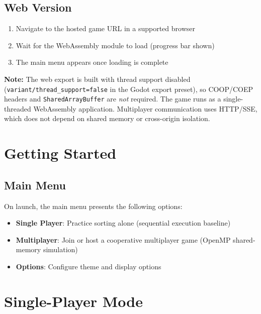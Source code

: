 \subsection{Web Version}

\begin{enumerate}
    \item Navigate to the hosted game URL in a supported browser
    \item Wait for the WebAssembly module to load (progress bar shown)
    \item The main menu appears once loading is complete
\end{enumerate}

\noindent\textbf{Note:} The web export is built with thread support disabled (\texttt{variant/thread\_support=false} in the Godot export preset), so COOP/COEP headers and \texttt{SharedArrayBuffer} are \emph{not} required. The game runs as a single-threaded WebAssembly application. Multiplayer communication uses HTTP/SSE, which does not depend on shared memory or cross-origin isolation.

\section{Getting Started}
\label{app:a:getting-started}

\subsection{Main Menu}

On launch, the main menu presents the following options:
\begin{itemize}
    \item \textbf{Single Player}: Practice sorting alone (sequential execution baseline)
    \item \textbf{Multiplayer}: Join or host a cooperative multiplayer game (OpenMP shared-memory simulation)
    \item \textbf{Options}: Configure theme and display options
\end{itemize}

\section{Single-Player Mode}
\label{app:a:singleplayer-mode}

